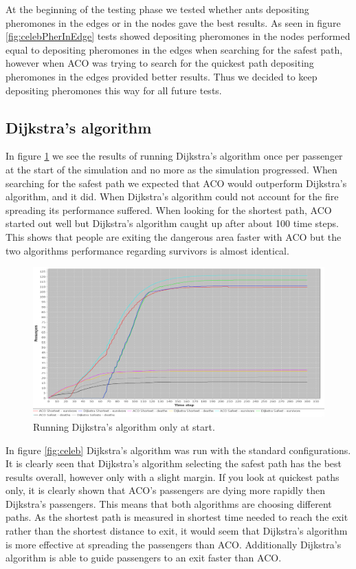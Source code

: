 At the beginning of the testing phase we tested whether ants depositing pheromones in the edges or in the nodes gave the best results.  As seen in figure \ref{fig:celebPherInEdge} tests showed depositing pheromones in the nodes performed equal to depositing pheromones in the edges when searching for the safest path, however when ACO was trying to search for the quickest path depositing pheromones in the edges provided better results. Thus we decided to keep depositing pheromones this way for all future tests.

\subsection{Dijkstra's algorithm}

In figure \ref{fig:celebDF} we see the results of running Dijkstra's algorithm once per passenger at the start of the simulation and no more as the simulation progressed. When searching for the safest path we expected that ACO would outperform Dijkstra's algorithm, and it did. When Dijkstra's algorithm could not account for the fire spreading its performance suffered. When looking for the shortest path, ACO started out well but Dijkstra's algorithm caught up after about 100 time steps. This shows that people are exiting the dangerous area faster with ACO but the two algorithms performance regarding survivors is almost identical.

\begin{figure} [h]
\centering
\hspace*{-1.0in}
\includegraphics[scale=0.35]{images/Graph-using-200-rounds-140-passangers-and-dijkstra-one-time.png}
\caption{Running Dijkstra's algorithm only at start.}
\label{fig:celebDF}
\end{figure}

In figure \ref{fig:celeb} Dijkstra's algorithm was run with the standard configurations. It is clearly seen that Dijkstra's algorithm selecting the safest path has the best results overall, however only with a slight margin. If you look at quickest paths only, it is clearly shown that ACO's passengers are dying more rapidly then Dijkstra's passengers. This means that both algorithms are choosing different paths. As the shortest path is measured in shortest time needed to reach the exit rather than the shortest distance to exit, it would seem that Dijkstra's algorithm is more effective at spreading the passengers than ACO. Additionally Dijkstra's algorithm is able to guide passengers to an exit faster than ACO.


